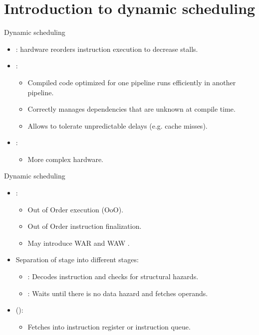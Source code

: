 \section{Introduction to dynamic scheduling}

\begin{frame}[t]{Dynamic scheduling}
\begin{itemize}
  \item {}: hardware reorders instruction execution to decrease stalls.

  \item {}:
    \begin{itemize}
      \item Compiled code optimized for one pipeline runs efficiently in another pipeline.
      \item Correctly manages dependencies that are unknown at compile time.
      \item Allows to tolerate unpredictable delays (e.g. cache misses).
    \end{itemize}

  \item {}:
    \begin{itemize}
      \item More complex hardware.
    \end{itemize}
\end{itemize}
\end{frame}

\begin{frame}[t]{Dynamic scheduling}
\begin{itemize}
  \item {}:
    \begin{itemize}
      \item Out of Order execution (OoO).
      \item Out of Order instruction finalization.
      \item May introduce WAR and WAW .
    \end{itemize}

  \item Separation of  stage into   different stages:
    \begin{itemize}
      \item {}: 
            Decodes instruction and checks for structural hazards.
      \item {}: 
            Waits until there is no data hazard and fetches operands.
    \end{itemize}

  \item {} ():
    \begin{itemize}
      \item Fetches into instruction register or instruction queue.
    \end{itemize}
\end{itemize}
\end{frame}

